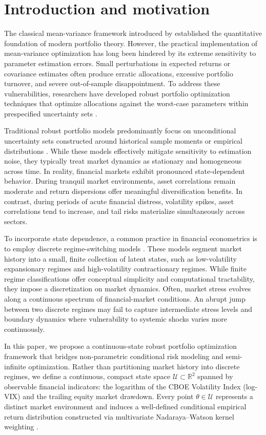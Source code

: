 \documentclass[smallextended]{svjour3}
\begin{document}
\section{Introduction and motivation}
The classical mean-variance framework introduced by \citet{markowitz1952portfolio} established the quantitative foundation of modern portfolio theory. However, the practical implementation of mean-variance optimization has long been hindered by its extreme sensitivity to parameter estimation errors. Small perturbations in expected returns or covariance estimates often produce erratic allocations, excessive portfolio turnover, and severe out-of-sample disappointment. To address these vulnerabilities, researchers have developed robust portfolio optimization techniques that optimize allocations against the worst-case parameters within prespecified uncertainty sets \citep{goldfarb2003robust, fabozzi2007robust}.

Traditional robust portfolio models predominantly focus on unconditional uncertainty sets constructed around historical sample moments or empirical distributions \citep{delage2010distributionally, esfahani2018data}. While these models effectively mitigate sensitivity to estimation noise, they typically treat market dynamics as stationary and homogeneous across time. In reality, financial markets exhibit pronounced state-dependent behavior. During tranquil market environments, asset correlations remain moderate and return dispersions offer meaningful diversification benefits. In contrast, during periods of acute financial distress, volatility spikes, asset correlations tend to increase, and tail risks materialize simultaneously across sectors.

To incorporate state dependence, a common practice in financial econometrics is to employ discrete regime-switching models \citep{ang2002international}. These models segment market history into a small, finite collection of latent states, such as low-volatility expansionary regimes and high-volatility contractionary regimes. While finite regime classifications offer conceptual simplicity and computational tractability, they impose a discretization on market dynamics. Often, market stress evolves along a continuous spectrum of financial-market conditions. An abrupt jump between two discrete regimes may fail to capture intermediate stress levels and boundary dynamics where vulnerability to systemic shocks varies more continuously.

In this paper, we propose a continuous-state robust portfolio optimization framework that bridges non-parametric conditional risk modeling and semi-infinite optimization. Rather than partitioning market history into discrete regimes, we define a continuous, compact state space $\mathcal{U} \subset \mathbb{R}^2$ spanned by observable financial indicators: the logarithm of the CBOE Volatility Index (log-VIX) \cite{cboe2026vix} and the trailing equity market drawdown. Every point $\theta \in \mathcal{U}$ represents a distinct market environment
and induces a well-defined conditional empirical return distribution
constructed via multivariate Nadaraya--Watson kernel weighting
\citep{nadaraya1964estimating,watson1964smooth}.
\end{document}
